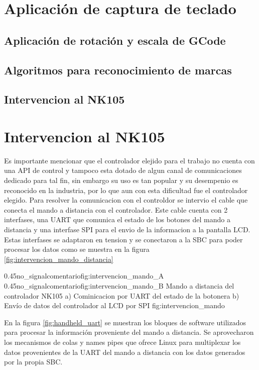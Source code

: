 \section{Aplicación de captura de teclado}
\subsection{Aplicación de rotación y escala de GCode}
\subsection{Algoritmos para reconocimiento de marcas}

\subsection{Intervencion al NK105}

\section{Intervencion al NK105}

   Es importante mencionar que el controlador elejido para el trabajo no cuenta con una API de control y tampoco esta dotado de algun canal de comunicaciones dedicado para tal fin, sin embargo su uso es tan popular y su desempenio es reconocido en la industria, por lo que aun con esta dificultad fue el controlador elegido.
   Para resolver la comunicacion con el controldor se intervio el cable que conecta el mando a distancia con el controlador.
   Este cable cuenta con 2 interfases, una UART que comunica el estado de los botones del mando a distancia y una interfase SPI para el envio de la informacion a la pantalla LCD.
Estas interfases se adaptaron en tension y se conectaron a la SBC para poder procesar los datos como se muestra en la figura \ref{fig:intervencion_mando_distancia}

\subfigab
   {0.45}{no_signal}{comentario}{fig:intervencion_mando_A}
   {0.45}{no_signal}{comentario}{fig:intervencion_mando_B}
         {Mando a distancia del controlador NK105 a) Cominicacion por UART del estado de la botonera b) Envío de datos del controlador al LCD por SPI}
         {fig:intervencion_mando}

En la figura \ref{fig:handheld_uart} se muestran los bloques de software utilizados para procesar la información proveniente del mando a distancia.
   Se aprovecharon los mecanismos de colas y names pipes que ofrece Linux para multiplexar los datos provenientes de la UART del mando a distancia con los datos generados por la propia SBC.


